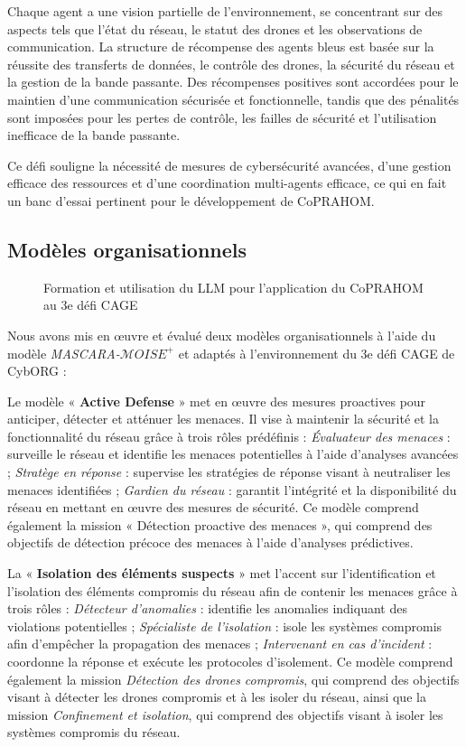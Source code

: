 Chaque agent a une vision partielle de l'environnement, se concentrant sur des aspects tels que l'état du réseau, le statut des drones et les observations de communication. La structure de récompense des agents bleus est basée sur la réussite des transferts de données, le contrôle des drones, la sécurité du réseau et la gestion de la bande passante. Des récompenses positives sont accordées pour le maintien d'une communication sécurisée et fonctionnelle, tandis que des pénalités sont imposées pour les pertes de contrôle, les failles de sécurité et l'utilisation inefficace de la bande passante.

Ce défi souligne la nécessité de mesures de cybersécurité avancées, d'une gestion efficace des ressources et d'une coordination multi-agents efficace, ce qui en fait un banc d'essai pertinent pour le développement de CoPRAHOM.

\subsection{Modèles organisationnels}

\begin{figure}[h!]
  \centering
  
  \caption{Formation et utilisation du LLM pour l'application du CoPRAHOM au 3e défi CAGE}\label{fig:llm_process}
\end{figure}


Nous avons mis en œuvre et évalué deux modèles organisationnels à l'aide du modèle \textit{MASCARA-$\mathcal{M}OISE^+$} et adaptés à l'environnement du 3e défi CAGE de CybORG :

Le modèle « \textbf{Active Defense} » met en œuvre des mesures proactives pour anticiper, détecter et atténuer les menaces. Il vise à maintenir la sécurité et la fonctionnalité du réseau grâce à trois rôles prédéfinis :
%
\textit{Évaluateur des menaces} : surveille le réseau et identifie les menaces potentielles à l'aide d'analyses avancées ;
\textit{Stratège en réponse} : supervise les stratégies de réponse visant à neutraliser les menaces identifiées ;
\textit{Gardien du réseau} : garantit l'intégrité et la disponibilité du réseau en mettant en œuvre des mesures de sécurité.
%
Ce modèle comprend également la mission « Détection proactive des menaces », qui comprend des objectifs de détection précoce des menaces à l'aide d'analyses prédictives.

La « \textbf{Isolation des éléments suspects} » met l'accent sur l'identification et l'isolation des éléments compromis du réseau afin de contenir les menaces grâce à trois rôles :
%
\textit{Détecteur d'anomalies} : identifie les anomalies indiquant des violations potentielles ;
\textit{Spécialiste de l'isolation} : isole les systèmes compromis afin d'empêcher la propagation des menaces ;
\textit{Intervenant en cas d'incident} : coordonne la réponse et exécute les protocoles d'isolement.
%
Ce modèle comprend également la mission \textit{Détection des drones compromis}, qui comprend des objectifs visant à détecter les drones compromis et à les isoler du réseau, ainsi que la mission \textit{Confinement et isolation}, qui comprend des objectifs visant à isoler les systèmes compromis du réseau.

